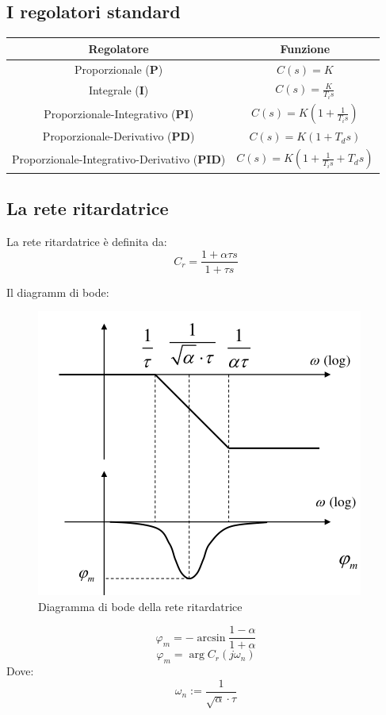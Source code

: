 \subsection{I regolatori standard}

\begin{table}[h!]
  \centering
  \begin{tabular}{||c | c||}
  \hline
  Regolatore & Funzione \\
  \hline
  \hline
  Proporzionale (\textbf{P}) & $C(s) = K$ \\
  Integrale (\textbf{I})& $C(s) = \frac{K}{T_i s}$ \\
  Proporzionale-Integrativo (\textbf{PI}) & $C(s) = K(1 + \frac{1}{T_i s})$ \\
  Proporzionale-Derivativo (\textbf{PD}) & $C(s) = K(1 + T_d s)$ \\
  Proporzionale-Integrativo-Derivativo (\textbf{PID}) & $C(s) = K(1 + \frac{1}{T_i s} + T_d s)$ \\
  \hline
  \end{tabular}
\end{table}
  
\newpage
\subsection{La rete ritardatrice}
La rete ritardatrice è definita da:
\begin{equation}
  C_r = \frac{1 + \alpha \tau s}{1 + \tau s}
  \label{eq:rete_ritardatrice}
\end{equation}

Il diagramm di bode:
\begin{figure}[h!]
  \centering
  \includegraphics[width=0.3\linewidth]{./images/rete_ritardatrice_bode.png}
  \caption{Diagramma di bode della rete ritardatrice}
  \label{fig:rete_ritardatrice_bode}
\end{figure}

\begin{equation}
 \varphi_m = -\arcsin \frac{1 - \alpha}{1 + \alpha} 
\end{equation}
\begin{equation}
 \varphi_m = \arg C_r(j\omega_n)
\end{equation}
Dove:
\begin{equation}
  \omega_n := \frac{1}{\sqrt{\alpha} \cdot \tau}
\end{equation}


